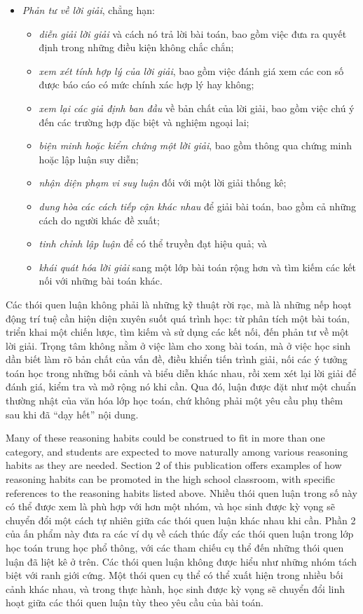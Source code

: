 \documentclass[
  10pt,
  a4paper,
  landscape,
  twoside,
  openany
]{scrbook}
\newcommand{\EN}[1]{#1}
\newcommand{\VI}[1]{#1}
\newcommand{\NOTE}[1]{#1}
\newcounter{example}
\begin{document}
{{\begin{itemize}
    \item \emph{Phản tư về lời giải}, chẳng hạn:
    \begin{itemize}
      \item \emph{diễn giải lời giải} và cách nó trả lời bài toán, bao gồm việc đưa ra quyết định trong những điều kiện không chắc chắn;
      \item \emph{xem xét tính hợp lý của lời giải}, bao gồm việc đánh giá xem các con số được báo cáo có mức chính xác hợp lý hay không;
      \item \emph{xem lại các giả định ban đầu} về bản chất của lời giải, bao gồm việc chú ý đến các trường hợp đặc biệt và nghiệm ngoại lai;
      \item \emph{biện minh hoặc kiểm chứng một lời giải}, bao gồm thông qua chứng minh hoặc lập luận suy diễn;
      \item \emph{nhận diện phạm vi suy luận} đối với một lời giải thống kê; 
      \item \emph{dung hòa các cách tiếp cận khác nhau} để giải bài toán, bao gồm cả những cách do người khác đề xuất;
      \item \emph{tinh chỉnh lập luận} để có thể truyền đạt hiệu quả; và
      \item \emph{khái quát hóa lời giải} sang một lớp bài toán rộng hơn và tìm kiếm các kết nối với những bài toán khác.
    \end{itemize}
  \end{itemize}
}
}
{
\NOTE{Các thói quen luận không phải là những kỹ thuật rời rạc, mà là những nếp hoạt động trí tuệ cần hiện diện xuyên suốt quá trình học: từ phân tích một bài toán, triển khai một chiến lược, tìm kiếm và sử dụng các kết nối, đến phản tư về một lời giải. Trọng tâm không nằm ở việc làm cho xong bài toán, mà ở việc học sinh dần biết làm rõ bản chất của vấn đề, điều khiển tiến trình giải, nối các ý tưởng toán học trong những bối cảnh và biểu diễn khác nhau, rồi xem xét lại lời giải để đánh giá, kiểm tra và mở rộng nó khi cần. Qua đó, luận được đặt như một chuẩn thường nhật của văn hóa lớp học toán, chứ không phải một yêu cầu phụ thêm sau khi đã ``dạy hết'' nội dung.}
}

\TriPara
{
\EN{Many of these reasoning habits could be construed to fit in more than one category, and students are expected to move naturally among various reasoning habits as they are needed. Section 2 of this publication offers examples of how reasoning habits can be promoted in the high school classroom, with specific references to the reasoning habits listed above.}
}
{
\VI{Nhiều thói quen luận trong số này có thể được xem là phù hợp với hơn một nhóm, và học sinh được kỳ vọng sẽ chuyển đổi một cách tự nhiên giữa các thói quen luận khác nhau khi cần. Phần 2 của ấn phẩm này đưa ra các ví dụ về cách thúc đẩy các thói quen luận trong lớp học toán trung học phổ thông, với các tham chiếu cụ thể đến những thói quen luận đã liệt kê ở trên.}
}
{
\NOTE{Các thói quen luận không được hiểu như những nhóm tách biệt với ranh giới cứng. Một thói quen cụ thể có thể xuất hiện trong nhiều bối cảnh khác nhau, và trong thực hành, học sinh được kỳ vọng sẽ chuyển đổi linh hoạt giữa các thói quen luận tùy theo yêu cầu của bài toán.}
}
\end{document}

